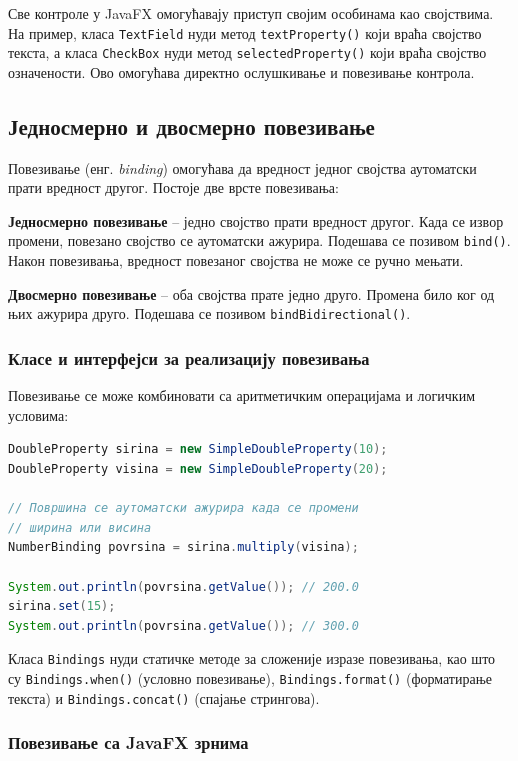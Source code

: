 Све контроле у JavaFX омогућавају приступ својим особинама као својствима. На пример, класа \texttt{TextField} нуди метод \texttt{textProperty()} који враћа својство текста, а класа \texttt{CheckBox} нуди метод \texttt{selectedProperty()} који враћа својство означености. Ово омогућава директно ослушкивање и повезивање контрола.


\subsection{Једносмерно и двосмерно повезивање}

Повезивање (енг. \textit{binding}) омогућава да вредност једног својства аутоматски прати вредност другог. Постоје две врсте повезивања:

\textbf{Једносмерно повезивање} – једно својство прати вредност другог. Када се извор промени, повезано својство се аутоматски ажурира. Подешава се позивом \texttt{bind()}. Након повезивања, вредност повезаног својства не може се ручно мењати.

\textbf{Двосмерно повезивање} – оба својства прате једно друго. Промена било ког од њих ажурира друго. Подешава се позивом \texttt{bindBidirectional()}.

\subsubsection{Класе и интерфејси за реализацију повезивања}

Повезивање се може комбиновати са аритметичким операцијама и логичким условима:


\begin{lstlisting}[language=Java]
DoubleProperty sirina = new SimpleDoubleProperty(10);
DoubleProperty visina = new SimpleDoubleProperty(20);
 
// Површина се аутоматски ажурира када се промени
// ширина или висина
NumberBinding povrsina = sirina.multiply(visina);
 
System.out.println(povrsina.getValue()); // 200.0
sirina.set(15);
System.out.println(povrsina.getValue()); // 300.0
\end{lstlisting}


Класа \texttt{Bindings} нуди статичке методе за сложеније изразе повезивања, као што су \texttt{Bindings.when()} (условно повезивање), \texttt{Bindings.format()} (форматирање текста) и \texttt{Bindings.concat()} (спајање стрингова).

\subsubsection{Повезивање са JavaFX зрнима}

